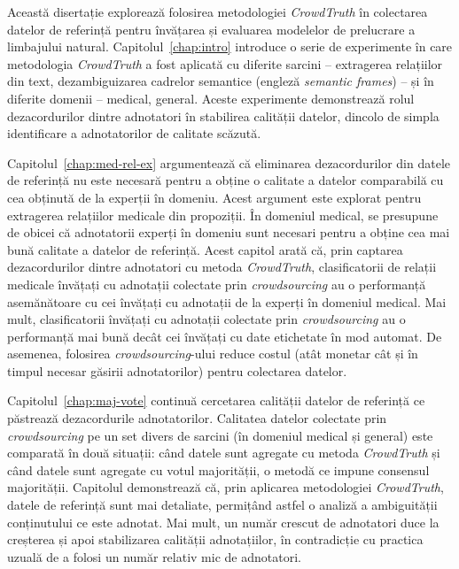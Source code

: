 Această disertație explorează folosirea metodologiei \textit{CrowdTruth} în colectarea datelor de referință pentru învățarea și evaluarea modelelor de prelucrare a limbajului natural. Capitolul~\ref{chap:intro} introduce o serie de experimente în care metodologia \textit{CrowdTruth} a fost aplicată cu diferite sarcini -- extragerea relațiilor din text, dezambiguizarea cadrelor semantice (engleză \textit{semantic frames}) -- și în diferite domenii -- medical, general. Aceste experimente demonstrează rolul dezacordurilor dintre adnotatori în stabilirea calității datelor, dincolo de simpla identificare a adnotatorilor de calitate scăzută.

Capitolul~\ref{chap:med-rel-ex} argumentează că eliminarea dezacordurilor din datele de referință nu este necesară pentru a obține o calitate a datelor comparabilă cu cea obținută de la experții în domeniu. Acest argument este explorat pentru extragerea relațiilor medicale din propoziții. În domeniul medical, se presupune de obicei că adnotatorii experți în domeniu sunt necesari pentru a obține cea mai bună calitate a datelor de referință. Acest capitol arată că, prin captarea dezacordurilor dintre adnotatori cu metoda \textit{CrowdTruth}, clasificatorii de relații medicale învățați cu adnotații colectate prin \textit{crowdsourcing} au o performanță asemănătoare cu cei învățați cu adnotații de la experți în domeniul medical. Mai mult, clasificatorii învățați cu adnotații colectate prin \textit{crowdsourcing} au o performanță mai bună decât cei învățați cu date etichetate în mod automat. De asemenea, folosirea \textit{crowdsourcing}-ului reduce costul (atât monetar cât și în timpul necesar găsirii adnotatorilor) pentru colectarea datelor.

Capitolul~\ref{chap:maj-vote} continuă cercetarea calității datelor de referință ce păstrează dezacordurile adnotatorilor. Calitatea datelor colectate prin \textit{crowdsourcing} pe un set divers de sarcini (în domeniul medical și general) este comparată în două situații: când datele sunt agregate cu metoda \textit{CrowdTruth} și când datele sunt agregate cu votul majorității, o metodă ce impune consensul majorității. Capitolul demonstrează că, prin aplicarea metodologiei \textit{CrowdTruth}, datele de referință sunt mai detaliate, permițând astfel o analiză a ambiguității conținutului ce este adnotat. Mai mult, un număr crescut de adnotatori duce la creșterea și apoi stabilizarea calității adnotațiilor, în contradicție cu practica uzuală de a folosi un număr relativ mic de adnotatori.


